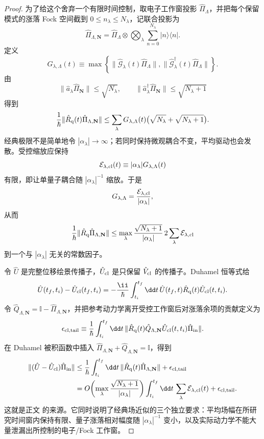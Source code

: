 \begin{proof}
为了给这个舍弃一个有限时间控制，取电子工作窗投影 $\hat\Pi_\Lambda$，并把每个保留模式的涨落 Fock 空间截到 $0\le n_\lambda\le N_\lambda$，记联合投影为
\[
\hat\Pi_{\Lambda,\mathbf N}
=\hat\Pi_\Lambda\otimes
\bigotimes_\lambda
\sum_{n=0}^{N_\lambda}|n\rangle\langle n|.
\]
定义
\[
G_{\lambda,\Lambda}(t)
\equiv
\max\!\left\{\|\hat{\mathcal G}_\lambda(t)\hat\Pi_\Lambda\|,\|\hat{\mathcal G}_\lambda^\dagger(t)\hat\Pi_\Lambda\|\right\}.
\]
由
\[
\|\hat a_\lambda\hat\Pi_{\mathbf N}\|
\le\sqrt{N_\lambda},
\qquad
\|\hat a_\lambda^\dagger\hat\Pi_{\mathbf N}\|
\le\sqrt{N_\lambda+1}
\]
得到
\[
\frac1\hbar
\|\hat R_{\rm q}(t)\hat\Pi_{\Lambda,\mathbf N}\|
\le
\sum_\lambda
G_{\lambda,\Lambda}(t)
\bigl(\sqrt{N_\lambda}+\sqrt{N_\lambda+1}\bigr).
\]
经典极限不是简单地令 $|\alpha_\lambda|\to\infty$；若同时保持微观耦合不变，平均驱动也会发散。受控缩放应保持
\[
\mathcal E_{\lambda,\rm cl}(t)
\equiv
|\alpha_\lambda|G_{\lambda,\Lambda}(t)
\]
有限，即让单量子耦合随 $|\alpha_\lambda|^{-1}$ 缩放。于是
\[
G_{\lambda,\Lambda}
=\frac{\mathcal E_{\lambda,\rm cl}}{|\alpha_\lambda|},
\]
从而
\[
\frac1\hbar
\|\hat R_{\rm q}\hat\Pi_{\Lambda,\mathbf N}\|
\le
\max_\lambda
\frac{\sqrt{N_\lambda+1}}{|\alpha_\lambda|}
\,
2\sum_\lambda\mathcal E_{\lambda,\rm cl}
\]
到一个与 $|\alpha_\lambda|$ 无关的常数因子。

令 $\hat U$ 是完整位移绘景传播子，$\hat U_{\rm cl}$ 是只保留 $\hat V_{\rm cl}$ 的传播子。Duhamel 恒等式给
\[
\hat U(t_f,t_i)-\hat U_{\rm cl}(t_f,t_i)
=
-\frac{\ii}{\hbar}
\int_{t_i}^{t_f}\dd t\,
\hat U(t_f,t)\hat R_{\rm q}(t)\hat U_{\rm cl}(t,t_i).
\]
令 $\hat Q_{\Lambda,\mathbf N}=\mathbb I-\hat\Pi_{\Lambda,\mathbf N}$，并把参考动力学离开受控工作窗后对涨落余项的贡献定义为
\[
\epsilon_{\rm cl,tail}
\equiv
\frac1\hbar\int_{t_i}^{t_f}\dd t\,
\|\hat R_{\rm q}(t)\hat Q_{\Lambda,\mathbf N}
\hat U_{\rm cl}(t,t_i)\hat\Pi_{\rm in}\|.
\]
在 Duhamel 被积函数中插入
$\hat\Pi_{\Lambda,\mathbf N}+\hat Q_{\Lambda,\mathbf N}=\mathbb I$，得到
\begin{align*}
\|(\hat U-\hat U_{\rm cl})\hat\Pi_{\rm in}\|
&\le
\frac1\hbar
\int_{t_i}^{t_f}\dd t\,
\|\hat R_{\rm q}(t)\hat\Pi_{\Lambda,\mathbf N}\|
+\epsilon_{\rm cl,tail}\\
&=
O\!\left(
\max_\lambda
\frac{\sqrt{N_\lambda+1}}{|\alpha_\lambda|}
\right)
\int_{t_i}^{t_f}\dd t\,
\sum_\lambda\mathcal E_{\lambda,\rm cl}(t)
+\epsilon_{\rm cl,tail}.
\end{align*}
这就是正文 的来源。它同时说明了经典场近似的三个独立要求：平均场幅在所研究时间窗内保持有限、量子涨落相对幅度随 $|\alpha_\lambda|^{-1}$ 变小，以及实际动力学不能大量泄漏出所控制的电子/Fock 工作窗。
\end{proof}


